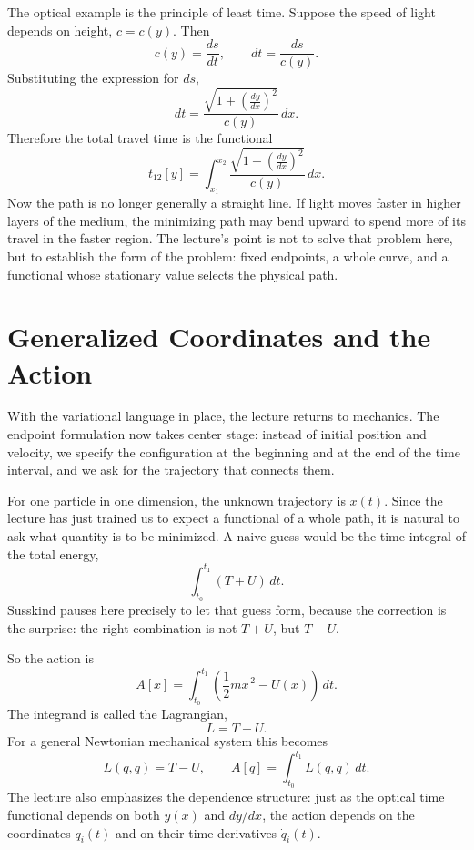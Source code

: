 The optical example is the principle of least time. Suppose the speed of light depends on height, \(c=c(y)\). Then
\begin{equation}
c(y)=\frac{ds}{dt},
\qquad
dt=\frac{ds}{c(y)}.
\end{equation}
Substituting the expression for \(ds\),
\begin{equation}
dt
=
\frac{\sqrt{1+\left(\frac{dy}{dx}\right)^2}}{c(y)}\,dx.
\end{equation}
Therefore the total travel time is the functional
\begin{equation}
t_{12}[y]
=
\int_{x_1}^{x_2}
\frac{\sqrt{1+\left(\frac{dy}{dx}\right)^2}}{c(y)}\,dx.
\end{equation}
Now the path is no longer generally a straight line. If light moves faster in higher layers of the medium, the minimizing path may bend upward to spend more of its travel in the faster region. The lecture's point is not to solve that problem here, but to establish the form of the problem: fixed endpoints, a whole curve, and a functional whose stationary value selects the physical path.

\section{Generalized Coordinates and the Action}

With the variational language in place, the lecture returns to mechanics. The endpoint formulation now takes center stage: instead of initial position and velocity, we specify the configuration at the beginning and at the end of the time interval, and we ask for the trajectory that connects them.

For one particle in one dimension, the unknown trajectory is \(x(t)\). Since the lecture has just trained us to expect a functional of a whole path, it is natural to ask what quantity is to be minimized. A naive guess would be the time integral of the total energy,
\begin{equation}
\int_{t_0}^{t_1} (T+U)\,dt.
\end{equation}
Susskind pauses here precisely to let that guess form, because the correction is the surprise: the right combination is not \(T+U\), but \(T-U\).

So the action is
\begin{equation}
A[x]
=
\int_{t_0}^{t_1}
\left(
\frac12 m\dot x^{\,2}-U(x)
\right)\,dt.
\end{equation}
The integrand is called the Lagrangian,
\begin{equation}
L = T-U.
\end{equation}
For a general Newtonian mechanical system this becomes
\begin{equation}
L(q,\dot q)=T-U,
\qquad
A[q]=\int_{t_0}^{t_1}L(q,\dot q)\,dt.
\end{equation}
The lecture also emphasizes the dependence structure: just as the optical time functional depends on both \(y(x)\) and \(dy/dx\), the action depends on the coordinates \(q_i(t)\) and on their time derivatives \(\dot q_i(t)\).


